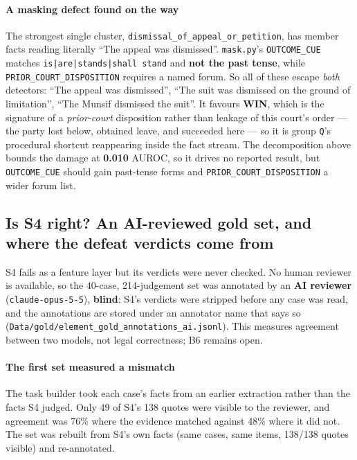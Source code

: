 \documentclass[12pt,a4paper]{article}
\newcommand{\code}[1]{\texttt{\small #1}}
\begin{document}
\paragraph{A masking defect found on the way} The strongest single cluster,
\code{dismissal\_of\_appeal\_or\_petition}, has member facts reading literally ``The appeal was
dismissed''. \code{mask.py}'s \code{OUTCOME\_CUE} matches \code{is|are|stands|shall stand} and
\textbf{not the past tense}, while \code{PRIOR\_COURT\_DISPOSITION} requires a named forum. So all of
these escape \emph{both} detectors: ``The appeal was dismissed'', ``The suit was dismissed on the
ground of limitation'', ``The Munsif dismissed the suit''. It favours \textbf{WIN}, which is the
signature of a \emph{prior-court} disposition rather than leakage of this court's order --- the party
lost below, obtained leave, and succeeded here --- so it is group \code{Q}'s procedural shortcut
reappearing inside the fact stream. The decomposition above bounds the damage at \textbf{0.010}
AUROC, so it drives no reported result, but \code{OUTCOME\_CUE} should gain past-tense forms and
\code{PRIOR\_COURT\_DISPOSITION} a wider forum list.

\subsection{Is S4 right? An AI-reviewed gold set, and where the defeat verdicts come from}\label{sec:s4gold}

S4 fails as a feature layer but its verdicts were never checked. No human reviewer is available, so
the 40-case, 214-judgement set was annotated by an \textbf{AI reviewer} (\code{claude-opus-5-5}),
\textbf{blind}: S4's verdicts were stripped before any case was read, and the annotations are stored
under an annotator name that says so (\code{Data/gold/element\_gold\_annotations\_ai.jsonl}). This
measures agreement between two models, not legal correctness; B6 remains open.

\paragraph{The first set measured a mismatch} The task builder took each case's facts from an
earlier extraction rather than the facts S4 judged. Only 49 of S4's 138 quotes were visible to the
reviewer, and agreement was 76\% where the evidence matched against 48\% where it did not. The set
was rebuilt from S4's own facts (same cases, same items, 138/138 quotes visible) and re-annotated.
\end{document}
